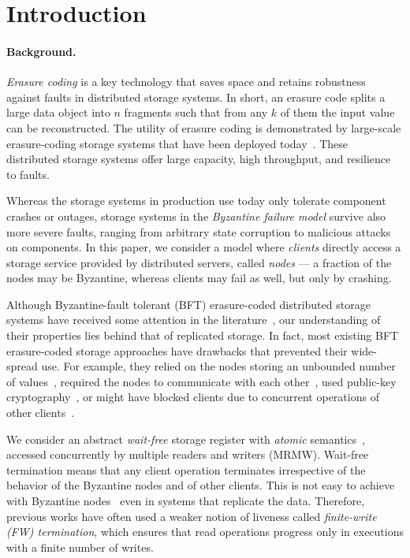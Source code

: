 \documentclass[oribibl]{llncs}
\theoremstyle{definition-boldhead}
\newcommand{\nodes}{nodes\xspace}
\begin{document}
\section{Introduction}

\paragraph{Background.}
\emph{Erasure coding} is a key technology that saves space and retains
robustness against faults in distributed storage systems. In short, an
erasure code splits a large data object into $n$ fragments such that
from any $k$ of them the input value can be reconstructed. The utility
of erasure coding is demonstrated by large-scale erasure-coding
storage systems that have been deployed
today~\cite{hsxocg12,cleversafect13}. These distributed storage
systems offer large capacity, high throughput, and resilience to
faults.

Whereas the storage systems in production use today only tolerate
component crashes or outages, storage systems in the \emph{Byzantine
  failure model} survive also more severe faults, ranging from
arbitrary state corruption to malicious attacks on components. In this
paper, we consider a model where \emph{clients} directly access a
storage service provided by distributed servers, called \emph{\nodes}
--- a fraction of the \nodes may be Byzantine, whereas clients may
fail as well, but only by crashing.

Although Byzantine-fault tolerant (BFT) erasure-coded distributed
storage systems have received some attention in the
literature~\cite{gwgr04,cactes06,hegare07b,dugule08,bcqas11}, our
understanding of their properties lies behind that of replicated
storage. In fact, most existing BFT erasure-coded storage approaches have drawbacks that
prevented their wide-spread use.  For example, they relied on the
\nodes storing an unbounded number of values~\cite{gwgr04}, required
the \nodes to communicate with each other~\cite{cactes06}, used
public-key cryptography~\cite{cactes06,hegare07b}, or might have
blocked clients due to concurrent operations of other
clients~\cite{hegare07b}.

We consider an abstract \emph{wait-free} storage register with
\emph{atomic} semantics~\cite{herwin90}, accessed concurrently by
multiple readers and writers (MRMW).  Wait-free termination means that
any client operation terminates irrespective of the behavior of the
Byzantine \nodes and of other clients.  This is not easy to achieve
with Byzantine \nodes~\cite{ackm06} even in systems that replicate
the data.  Therefore, previous works have often used a weaker notion
of liveness called \emph{finite-write (FW) termination}, which ensures
that read operations progress only in executions with a finite number
of writes.
\end{document}
